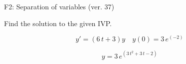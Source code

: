 \begin{exercise}
  \begin{exerciseTitle}F2: Separation of variables (ver. 37)\end{exerciseTitle}
  \begin{exerciseStatement}
    
Find the solution to the given IVP.

    
\[y'=( 6 \, t + 3 )y\hspace{1em} y(0)= 3 \, e^{\left(-2\right)}\]

  \end{exerciseStatement}
  \begin{exerciseAnswer}
    
\[y= 3 \, e^{\left(3 \, t^{2} + 3 \, t - 2\right)}\]

  \end{exerciseAnswer}
\end{exercise}